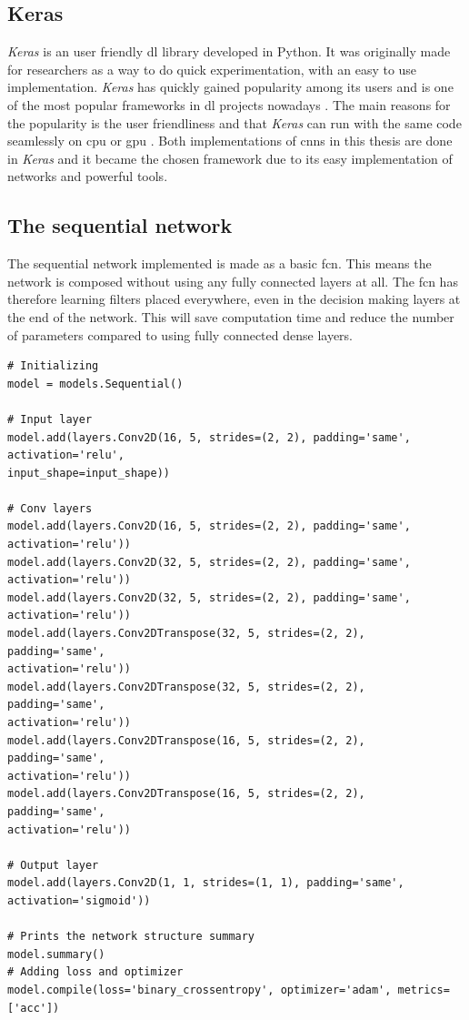 \documentclass[USenglish]{ifimaster}  %
\begin{document}
\subsection{Keras}
\textit{Keras} is an user friendly \ac{dl} library developed in Python. It was originally made for researchers as a way to do quick experimentation, with an easy to use implementation. \textit{Keras} has quickly gained popularity among its users and is one of the most popular frameworks in \ac{dl} projects nowadays \cite{Francois_Deep_learning_with_python}. The main reasons for the popularity is the user friendliness and that \textit{Keras} can run with the same code seamlessly on \ac{cpu} or \ac{gpu} \cite{Francois_Deep_learning_with_python}. Both implementations of \acp{cnn} in this thesis are done in \textit{Keras} and it became the chosen framework due to its easy implementation of networks and powerful tools.

\subsection{The sequential network}
The sequential network implemented is made as a basic \ac{fcn}. This means the network is composed without using any fully connected layers at all. The \ac{fcn} has therefore learning filters placed everywhere, even in the decision making layers at the end of the network. This will save computation time and reduce the number of parameters compared to using fully connected dense layers.

\begin{verbatim}
# Initializing
model = models.Sequential()

# Input layer
model.add(layers.Conv2D(16, 5, strides=(2, 2), padding='same',
activation='relu', 
input_shape=input_shape))

# Conv layers
model.add(layers.Conv2D(16, 5, strides=(2, 2), padding='same',
activation='relu'))
model.add(layers.Conv2D(32, 5, strides=(2, 2), padding='same',
activation='relu'))
model.add(layers.Conv2D(32, 5, strides=(2, 2), padding='same', 
activation='relu'))
model.add(layers.Conv2DTranspose(32, 5, strides=(2, 2), padding='same', 
activation='relu'))
model.add(layers.Conv2DTranspose(32, 5, strides=(2, 2), padding='same', 
activation='relu'))
model.add(layers.Conv2DTranspose(16, 5, strides=(2, 2), padding='same', 
activation='relu'))
model.add(layers.Conv2DTranspose(16, 5, strides=(2, 2), padding='same', 
activation='relu'))

# Output layer
model.add(layers.Conv2D(1, 1, strides=(1, 1), padding='same',
activation='sigmoid'))

# Prints the network structure summary
model.summary()
# Adding loss and optimizer
model.compile(loss='binary_crossentropy', optimizer='adam', metrics=['acc'])
\end{verbatim}
\end{document}

